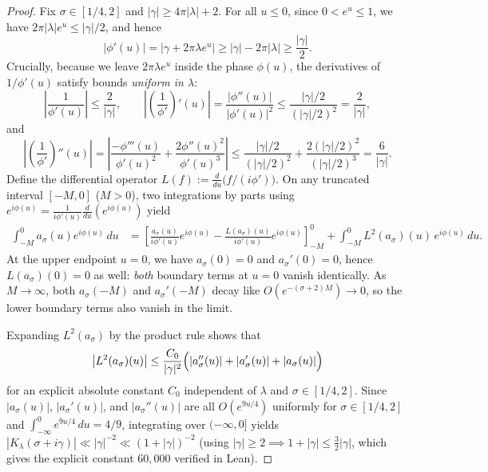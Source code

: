 \documentclass[11pt,reqno]{amsart}
\numberwithin{equation}{section}
\theoremstyle{definition}
\newcommand{\1}{\mathbf{1}}
\begin{document}
\begin{proof}
Fix $\sigma \in [1/4, 2]$ and $|\gamma| \ge 4\pi|\lambda| + 2$. For all $u \le 0$, since $0 < e^u \le 1$, we have $2\pi|\lambda| e^u \le |\gamma|/2$, and hence
\begin{equation}\label{eq:phase-lower}
  |\phi'(u)| = |\gamma + 2\pi\lambda e^u| \ge |\gamma| - 2\pi|\lambda| \ge \frac{|\gamma|}{2}.
\end{equation}
Crucially, because we leave $2\pi\lambda e^u$ inside the phase $\phi(u)$, the derivatives of $1/\phi'(u)$ satisfy bounds \emph{uniform in $\lambda$}:
\[
  \left|\frac{1}{\phi'(u)}\right| \le \frac{2}{|\gamma|}, \qquad
  \left|\left(\frac{1}{\phi'}\right)'(u)\right| = \frac{|\phi''(u)|}{|\phi'(u)|^2} \le \frac{|\gamma|/2}{(|\gamma|/2)^2} = \frac{2}{|\gamma|},
\]
and
\[
  \left|\left(\frac{1}{\phi'}\right)''(u)\right|
  = \left|\frac{-\phi'''(u)}{\phi'(u)^2} + \frac{2\phi''(u)^2}{\phi'(u)^3}\right|
  \le \frac{|\gamma|/2}{(|\gamma|/2)^2} + \frac{2(|\gamma|/2)^2}{(|\gamma|/2)^3}
  = \frac{6}{|\gamma|}.
\]
Define the differential operator $L(f) := \frac{d}{du}\bigl(f / (i\phi')\bigr)$. On any truncated interval $[-M, 0]$ ($M > 0$), two integrations by parts using $e^{i\phi(u)} = \frac{1}{i\phi'(u)}\frac{d}{du}(e^{i\phi(u)})$ yield
\begin{align*}
  \int_{-M}^0 a_\sigma(u) e^{i\phi(u)}\,du
  &= \left[\frac{a_\sigma(u)}{i\phi'(u)}e^{i\phi(u)} - \frac{L(a_\sigma)(u)}{i\phi'(u)}e^{i\phi(u)}\right]_{-M}^0
     + \int_{-M}^0 L^2(a_\sigma)(u)\, e^{i\phi(u)}\,du.
\end{align*}
At the upper endpoint $u = 0$, we have $a_\sigma(0) = 0$ and $a_\sigma'(0) = 0$, hence $L(a_\sigma)(0) = 0$ as well: \emph{both} boundary terms at $u = 0$ vanish identically. As $M \to \infty$, both $a_\sigma(-M)$ and $a_\sigma'(-M)$ decay like $O(e^{-(\sigma+2)M}) \to 0$, so the lower boundary terms also vanish in the limit.

Expanding $L^2(a_\sigma)$ by the product rule shows that
\[
  \bigl|L^2(a_\sigma)(u)\bigr|
  \le \frac{C_0}{|\gamma|^2}\Bigl(|a_\sigma''(u)| + |a_\sigma'(u)| + |a_\sigma(u)|\Bigr)
\]
for an explicit absolute constant $C_0$ independent of $\lambda$ and $\sigma \in [1/4, 2]$. Since $|a_\sigma(u)|$, $|a_\sigma'(u)|$, and $|a_\sigma''(u)|$ are all $O(e^{9u/4})$ uniformly for $\sigma \in [1/4, 2]$ and $\int_{-\infty}^0 e^{9u/4}\,du = 4/9$, integrating over $(-\infty, 0]$ yields $|K_\lambda(\sigma + i\gamma)| \ll |\gamma|^{-2} \ll (1+|\gamma|)^{-2}$ (using $|\gamma| \ge 2 \implies 1 + |\gamma| \le \frac{3}{2}|\gamma|$, which gives the explicit constant $60{,}000$ verified in Lean).
\end{proof}
\end{document}
